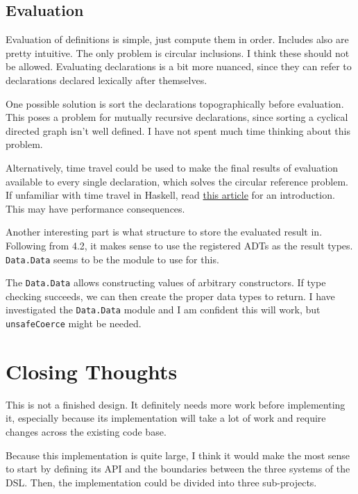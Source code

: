 \subsection{Evaluation}

Evaluation of definitions is simple, just compute them in order. Includes also
are pretty intuitive. The only problem is circular inclusions. I think these
should not be allowed. Evaluating declarations is a bit more nuanced,
since they can refer to declarations declared lexically after themselves.

One possible solution is sort the declarations topographically before
evaluation. This poses a problem for mutually recursive declarations, since
sorting a cyclical directed graph isn't well defined. I have not spent much
time thinking about this problem.

Alternatively, time travel could be used to make the final results of
evaluation available to every single declaration, which solves
the circular reference problem. If unfamiliar with time travel in Haskell, read
\href{https://blog.csongor.co.uk/time-travel-in-haskell-for-dummies/}{this article}
for an introduction. This may have performance consequences.

Another interesting part is what structure to store the evaluated result in.
Following from 4.2, it makes sense to use the registered ADTs as the result
types. \texttt{Data.Data} seems to be the module to use for this.

The \texttt{Data.Data} allows constructing values of arbitrary constructors.
If type checking succeeds, we can then create the proper data types to return.
I have investigated the \texttt{Data.Data} module and I am confident this will
work, but \texttt{unsafeCoerce} might be needed.

\section{Closing Thoughts}

This is not a finished design. It definitely needs more work before
implementing it, especially because its implementation will take a lot of work
and require changes across the existing code base.

Because this implementation is quite large, I think it would make the most
sense to start by defining its API and the boundaries between the three systems
of the DSL. Then, the implementation could be divided into three
sub-projects.
